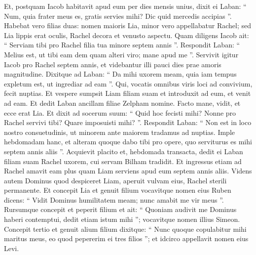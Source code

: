 \begin{biblechapter}
\begin{biblechapter}
\begin{biblechapter}
\begin{biblechapter}
\begin{biblechapter}
\begin{biblechapter}
\begin{biblechapter}
\begin{biblechapter}
\begin{biblechapter}
\begin{biblechapter}
\begin{biblechapter}
\begin{biblechapter}
\begin{biblechapter}
\begin{biblechapter}
\begin{biblechapter}
\begin{biblechapter}
\begin{biblechapter}
\begin{biblechapter}
\begin{biblechapter}
\begin{biblechapter}
\begin{biblechapter}
\begin{biblechapter}
\begin{biblechapter}
\begin{biblechapter}
\begin{biblechapter}
\begin{biblechapter}
\begin{biblechapter}
\begin{biblechapter}
\begin{biblechapter}
 Et, postquam Iacob habitavit apud eum per dies mensis unius, 
\verse dixit ei Laban: “ Num, quia frater meus es, gratis servies mihi? Dic quid mercedis accipias ”. 
\verse Habebat vero filias duas: nomen maioris Lia, minor vero appellabatur Rachel; 
\verse sed Lia lippis erat oculis, Rachel decora et venusto aspectu. 
\verse Quam diligens Iacob ait: “ Serviam tibi pro Rachel filia tua minore septem annis ”. 
\verse Respondit Laban: “ Melius est, ut tibi eam dem quam alteri viro; mane apud me ”.
 \verse Servivit igitur Iacob pro Rachel septem annis, et videbantur illi pauci dies prae amoris magnitudine. 
\verse Dixitque ad Laban: “ Da mihi uxorem meam, quia iam tempus expletum est, ut ingrediar ad eam ”. 
\verse Qui, vocatis omnibus viris loci ad convivium, fecit nuptias. 
\verse Et vespere sumpsit Liam filiam suam et introduxit ad eum, et venit ad eam. 
\verse Et dedit Laban ancillam filiae Zelpham nomine.
 Facto mane, vidit, et ecce erat Lia. 
\verse Et dixit ad socerum suum: “ Quid hoc fecisti mihi? Nonne pro Rachel servivi tibi? Quare imposuisti mihi? ”. 
\verse Respondit Laban: “ Non est in loco nostro consuetudinis, ut minorem ante maiorem tradamus ad nuptias. 
\verse Imple hebdomadam hanc, et alteram quoque dabo tibi pro opere, quo serviturus es mihi septem annis aliis ”.
 \verse Acquievit placito et, hebdomada transacta, dedit ei Laban filiam suam Rachel uxorem, 
\verse cui servam Bilham tradidit. 
\verse Et ingressus etiam ad Rachel amavit eam plus quam Liam serviens apud eum septem annis aliis.
 \verse Videns autem Dominus quod despiceret Liam, aperuit vulvam eius, Rachel sterili permanente. 
\verse Et concepit Lia et genuit filium vocavitque nomen eius Ruben dicens: “ Vidit Dominus humilitatem meam; nunc amabit me vir meus ”.
 \verse Rursumque concepit et peperit filium et ait: “ Quoniam audivit me Dominus haberi contemptui, dedit etiam istum mihi ”; vocavitque nomen illius Simeon.
 \verse Concepit tertio et genuit alium filium dixitque: “ Nunc quoque copulabitur mihi maritus meus, eo quod pepererim ei tres filios ”; et idcirco appellavit nomen eius Levi.

\end{biblechapter}
\end{biblechapter}
\end{biblechapter}
\end{biblechapter}
\end{biblechapter}
\end{biblechapter}
\end{biblechapter}
\end{biblechapter}
\end{biblechapter}
\end{biblechapter}
\end{biblechapter}
\end{biblechapter}
\end{biblechapter}
\end{biblechapter}
\end{biblechapter}
\end{biblechapter}
\end{biblechapter}
\end{biblechapter}
\end{biblechapter}
\end{biblechapter}
\end{biblechapter}
\end{biblechapter}
\end{biblechapter}
\end{biblechapter}
\end{biblechapter}
\end{biblechapter}
\end{biblechapter}
\end{biblechapter}
\end{biblechapter}
